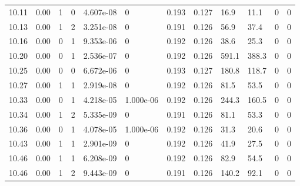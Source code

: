 \documentclass[preview]{standalone}
\begin{document}
{{{{{{{\begin{tabular}{L{1.2cm}C{1.2cm} C{0.3cm}C{0.5cm} C{1.4cm}C{1.4cm} C{1.4cm}C{1.4cm} C{1.6cm}C{1.6cm} C{1.6cm}C{1.6cm}}
  10.11  &  0.00  & 1     &  0 &  4.607e-08  & 0  &  0.193&   0.127& 16.9 & 11.1   &  0 & 0  \\ 
  10.13  &  0.00  & 1     &  2 &  3.251e-08  & 0  &  0.191&   0.126& 56.9 & 37.4   &  0 & 0  \\ 
  10.16  &  0.00  & 0     &  1 &  9.353e-06  & 0  &  0.192&   0.126& 38.6 & 25.3   &  0 & 0  \\ 
  10.20  &  0.00  & 0     &  1 &  2.536e-07  & 0  &  0.192&   0.126& 591.1 & 388.3   &  0 & 0  \\ 
  10.25  &  0.00  & 0     &  0 &  6.672e-06  & 0  &  0.193&   0.127& 180.8 & 118.7   &  0 & 0  \\ 
  10.27  &  0.00  & 1     &  1 &  2.919e-08  & 0  &  0.192&   0.126& 81.5 & 53.5   &  0 & 0  \\ 
  10.33  &  0.00  & 0     &  1 &  4.218e-05  & 1.000e-06  &  0.192&   0.126& 244.3 & 160.5   &  0 & 0  \\ 
  10.34  &  0.00  & 1     &  2 &  5.335e-09  & 0  &  0.191&   0.126& 81.1 & 53.3   &  0 & 0  \\ 
  10.36  &  0.00  & 0     &  1 &  4.078e-05  & 1.000e-06  &  0.192&   0.126& 31.3 & 20.6   &  0 & 0  \\ 
  10.43  &  0.00  & 1     &  1 &  2.901e-09  & 0  &  0.192&   0.126& 41.9 & 27.5   &  0 & 0  \\ 
  10.46  &  0.00  & 1     &  1 &  6.208e-09  & 0  &  0.192&   0.126& 82.9 & 54.5   &  0 & 0  \\ 
  10.46  &  0.00  & 1     &  2 &  9.443e-09  & 0  &  0.191&   0.126& 140.2 & 92.1   &  0 & 0  \\ 
\hline 
\end{tabular} 

}}}}}}}
\end{document}
